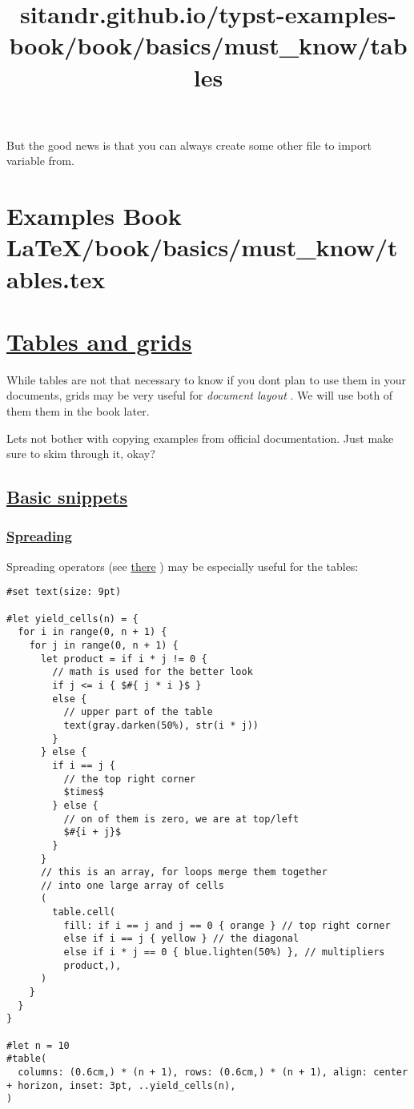 But the good news is that you can always create some other file to
import variable from.


\section{Examples Book LaTeX/book/basics/must_know/tables.tex}
\title{sitandr.github.io/typst-examples-book/book/basics/must_know/tables}

\section{\texorpdfstring{\hyperref[tables-and-grids]{Tables and
grids}}{Tables and grids}}\label{tables-and-grids}

While tables are not that necessary to know if you don\textquotesingle t
plan to use them in your documents, grids may be very useful for
\emph{document layout} . We will use both of them them in the book
later.

Let\textquotesingle s not bother with copying examples from official
documentation. Just make sure to skim through it, okay?

\subsection{\texorpdfstring{\hyperref[basic-snippets]{Basic
snippets}}{Basic snippets}}\label{basic-snippets}

\subsubsection{\texorpdfstring{\hyperref[spreading]{Spreading}}{Spreading}}\label{spreading}

Spreading operators (see \href{../scripting/arguments.html}{there} ) may
be especially useful for the tables:

\begin{verbatim}
#set text(size: 9pt)

#let yield_cells(n) = {
  for i in range(0, n + 1) {
    for j in range(0, n + 1) {
      let product = if i * j != 0 {
        // math is used for the better look
        if j <= i { $#{ j * i }$ }
        else {
          // upper part of the table
          text(gray.darken(50%), str(i * j))
        }
      } else {
        if i == j {
          // the top right corner
          $times$
        } else {
          // on of them is zero, we are at top/left
          $#{i + j}$
        }
      }
      // this is an array, for loops merge them together
      // into one large array of cells
      (
        table.cell(
          fill: if i == j and j == 0 { orange } // top right corner
          else if i == j { yellow } // the diagonal
          else if i * j == 0 { blue.lighten(50%) }, // multipliers
          product,),
      )
    }
  }
}

#let n = 10
#table(
  columns: (0.6cm,) * (n + 1), rows: (0.6cm,) * (n + 1), align: center + horizon, inset: 3pt, ..yield_cells(n),
)
\end{verbatim}

